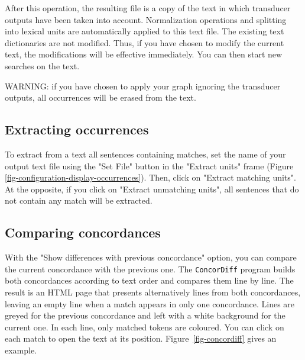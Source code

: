 \bigskip
\noindent After this operation, the resulting file is a copy of the text
in which transducer outputs have been taken into account. Normalization
operations and splitting into lexical units are automatically applied to
this text file. The existing text dictionaries are not modified. Thus, if you
have chosen to modify the current text, the modifications will be effective
immediately. You can then start new searches on the text.

\bigskip
\noindent WARNING: if you have chosen to apply your graph ignoring the
transducer outputs, all occurrences will be erased from the text.




\subsection{Extracting occurrences}
To extract from a text all sentences containing matches, set the name of your
output text file using the "Set File" button in the "Extract units" frame (Figure
\ref{fig-configuration-display-occurrences}). Then, click on "Extract matching
units". At the opposite, if you click on "Extract unmatching units", all
sentences that do not contain any match will be extracted.


\subsection{Comparing concordances}
\label{section-comparing-concordances}
With the "Show differences with previous concordance" option, you can compare the current
concordance with the previous one. The  \verb+ConcorDiff+ program builds both concordances
according to text order and compares them line by line. The result is an HTML page that
presents alternatively lines from both concordances, leaving an empty line when a match
 appears in only one concordance. 
Lines are greyed for the previous concordance and left with a white background for the current one.
In each line, only matched tokens are coloured. You can click on each match to open the text at its position. Figure~\ref{fig-concordiff} gives an example.

